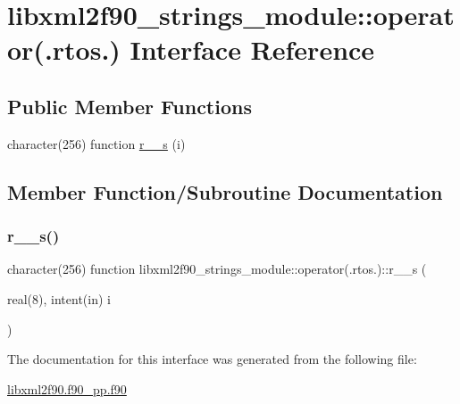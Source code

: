 \hypertarget{interfacelibxml2f90__strings__module_1_1operator_07_8rtos_8_08}{}\section{libxml2f90\+\_\+strings\+\_\+module\+:\+:operator(.rtos.) Interface Reference}
\label{interfacelibxml2f90__strings__module_1_1operator_07_8rtos_8_08}
\subsection*{Public Member Functions}
\begin{DoxyCompactItemize}
\item 
character(256) function \hyperlink{interfacelibxml2f90__strings__module_1_1operator_07_8rtos_8_08_a273ad373e7e149b8f74811d9f22401a4}{r\+\_\+\_\+s} (i)
\end{DoxyCompactItemize}


\subsection{Member Function/\+Subroutine Documentation}
\mbox{\label{interfacelibxml2f90__strings__module_1_1operator_07_8rtos_8_08_a273ad373e7e149b8f74811d9f22401a4}} 
\subsubsection{\texorpdfstring{r\+\_\+\_\+s()}{r\_2\_s()}}
{\footnotesize\ttfamily character(256) function libxml2f90\+\_\+strings\+\_\+module\+::operator(.rtos.)\+::r\+\_\+\_\+s (\begin{DoxyParamCaption}\item[{real(8), intent(in)}]{i }\end{DoxyParamCaption})}



The documentation for this interface was generated from the following file\+:\begin{DoxyCompactItemize}
\item 
\hyperlink{libxml2f90_8f90__pp_8f90}{libxml2f90.\+f90\+\_\+pp.\+f90}\end{DoxyCompactItemize}

